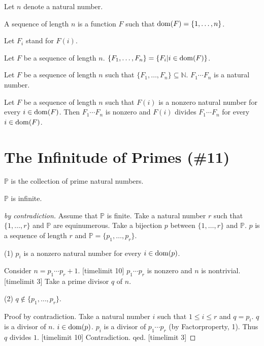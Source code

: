 \documentclass{article}
\newcommand{\Prod}[3]{#1_{#2} \cdots #1_{#3}}
\newcommand{\Seq}[2]{\{#1,\dots,#2\}}
\newcommand{\FinSet}[3]{\{#1_{#2},\dots,#1_{#3}\}}
\newcommand{\Primes}{\mathbb{P}}
\begin{document}
\begin{forthel}
  Let $n$ denote a natural number.

\begin{definition}
A sequence of length $n$ is a
function $F$ such that $\dom(F) = \Seq{1}{n}$.
\end{definition}

Let $F_{i}$ stand for $F(i)$.

\begin{definition}
Let $F$ be a sequence of length $n$.
$\FinSet{F}{1}{n} = \{ F_{i} | i \in \dom(F)\}$.
\end{definition}





\begin{signature}
Let $F$ be a sequence of length $n$
such that $\FinSet{F}{1}{n} \subseteq \mathbb{N}$.
$\Prod{F}{1}{n}$ is a natural number.
\end{signature}

\begin{axiom}[Factorproperty]
Let $F$ be a sequence of length $n$
such that $F(i)$ is a nonzero natural number for every $i \in \operatorname{dom}(F)$.
Then $\Prod{F}{1}{n}$ is nonzero and
$F(i)$ divides $\Prod{F}{1}{n}$ for every $i \in \operatorname{dom}(F)$.
\end{axiom}

\end{forthel}

\section{The Infinitude of Primes (\#11)}

\begin{forthel}

\begin{signature}
$\Primes$ is the collection of prime natural numbers.
\end{signature}

\begin{theorem}[Euclid]
$\Primes$ is infinite.
\end{theorem}
\begin{proof}[by contradiction]
Assume that $\Primes$ is finite.
Take a natural number $r$ such that $\Seq{1}{r}$ and $\Primes$ are equinumerous.
Take a bijection $p$ between $\Seq{1}{r}$ and $\Primes$.
$p$ is a sequence of length $r$ and
$\Primes = \FinSet{p}{1}{r}$.

(1) $p_{i}$ is a nonzero natural number for every
$i \in  \operatorname{dom}(p)$.

Consider $n = \Prod{p}{1}{r}+1$. [timelimit 10]
$\Prod{p}{1}{r}$ is nonzero and $n$ is nontrivial. [timelimit 3]
Take a prime divisor $q$ of $n$.

(2) $q \notin \FinSet{p}{1}{r}$.

Proof by contradiction.
Take a natural number $i$ such that $1 \leq i \leq r$
and $q=p_{i}$.
$q$ is a divisor of $n$.
$i \in \operatorname{dom}(p)$.
$p_{i}$ is a divisor of $\Prod{p}{1}{r}$
(by Factorproperty, 1).
Thus $q$ divides $1$. [timelimit 10]
Contradiction. qed.
[timelimit 3]
\end{proof}
\end{forthel}
\end{document}
